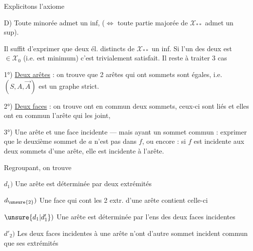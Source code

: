 Explicitons l'axiome

D) Toute   minorée \inserted{$\ne\varnothing$}   admet un inf,
($\Longleftrightarrow$ toute partie majorée \inserted{$\ne\varnothing$} de $\mathcal X_{**}$ admet un sup).


Il suffit d'exprimer que deux él. distincts  de $\mathcal X_{**}$   un inf. Si l'un des deux est $\in\mathcal X_0$ (i.e. est minimum)
c'est trivialement satisfait. Il reste à traiter $3$ cas

1°) \uline{Deux arêtes} : on trouve que 2 arêtes qui ont 
sommets sont égales, i.e. $(S,A,\vec A)$ est un graphe strict.

2°) \uline{Deux faces} : on trouve  
ont en commun deux sommets,  ceux-ci sont liés
 et elles  ont en commun l'arête qui les joint,

3°) Une arête  et une face    incidente --- mais
ayant un sommet commun :  exprimer
que le deuxième sommet de $a$ n'est pas dans $f$,
ou encore  : si $f$ est incidente aux
deux sommets d'une arête, elle est incidente
à l'arête.

Regroupant, on trouve

$d_1)$ Une arête est déterminée par   deux extrémités

$d_{\unsure{2}})$ Une face qui cont les 2 extr. d'une arête contient celle-ci

$\unsure{d_1|d'_1})$ Une arête est déterminée par l'ens des deux
faces incidentes

$d'_2)$ Les deux faces incidentes à une arête n'ont d'autre
sommet incident commun que ses extrémités
